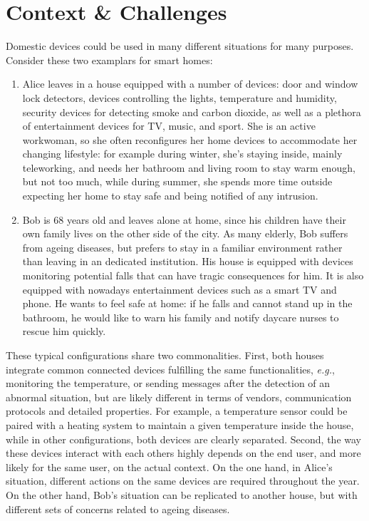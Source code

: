 \section{Context \& Challenges}
\label{sec:Context-Challenges}

Domestic \IOT devices could be used in many different situations for many purposes. Consider these two examplars for smart homes:
\begin{enumerate}
	\item Alice leaves in a house equipped with a number of devices: door and window lock detectors, devices controlling the lights, temperature and humidity, security devices for detecting smoke and carbon dioxide, as well as a plethora of entertainment devices for TV, music, and sport. She is an active workwoman, so she often reconfigures her home devices to accommodate her changing lifestyle: for example during winter, she's staying inside, mainly teleworking, and needs her bathroom and living room to stay warm enough, but not too much, while during summer, she spends more time outside expecting her home to stay safe and being notified of any intrusion.
	
	\item Bob is 68 years old and leaves alone at home, since his children have their own family lives on the other side of the city. As many elderly, Bob suffers from ageing diseases, but prefers to stay in a familiar environment rather than leaving in an dedicated institution. His house is equipped with devices monitoring potential falls that can have tragic consequences for him. It is also equipped with nowadays entertainment devices such as a smart TV and phone. He wants to feel safe at home: if he falls and cannot stand up in the bathroom, he would like to warn his family and notify daycare nurses to rescue him quickly.
\end{enumerate}

These typical configurations share two commonalities. First, both houses integrate common connected devices fulfilling the same functionalities, \textit{e.g.}, monitoring the temperature, or sending messages after the detection of an abnormal situation, but are likely different in terms of vendors, communication protocols and detailed properties. For example, a temperature sensor could be paired with a heating system to maintain a given temperature inside the house, while in other configurations, both devices are clearly separated. Second, the way these devices interact with each others highly depends on the end user, and more likely for the same user, on the actual context. On the one hand, in Alice's situation, different actions on the same devices are required throughout the year. On the other hand, Bob's situation can be replicated to another house, but with different sets of concerns related to ageing diseases.

